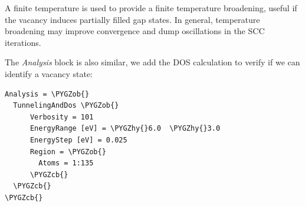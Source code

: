 \documentclass[a4paper,11pt,english]{sphinxmanual}
\def\PYGZob{\char`\{}
\def\PYGZcb{\char`\}}
\def\PYGZhy{\char`\-}
\begin{document}
{{A finite temperature is used to provide a finite temperature
broadening, useful if the vacancy induces partially filled gap
states. In general, temperature broadening may improve convergence and
dump oscillations in the SCC iterations.

The \emph{Analysis} block is also similar, we add the DOS calculation to
verify if we can identify a vacancy state:

\begin{Verbatim}[commandchars=\\\{\}]
Analysis = \PYGZob{}
  TunnelingAndDos \PYGZob{}
      Verbosity = 101
      EnergyRange [eV] = \PYGZhy{}6.0  \PYGZhy{}3.0
      EnergyStep [eV] = 0.025
      Region = \PYGZob{}
        Atoms = 1:135
      \PYGZcb{}
  \PYGZcb{}
\PYGZcb{}
\end{Verbatim}

}}
\end{document}
